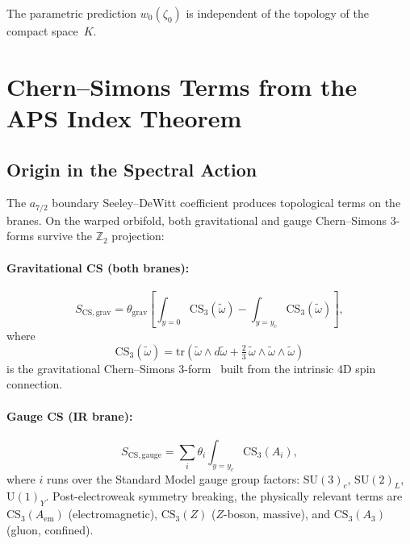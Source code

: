 \begin{corollary}\label{cor:4-topology}
The parametric prediction $w_0(\zeta_0)$ is independent of the topology of the compact space~$K$.
\end{corollary}


\section{Chern--Simons Terms from the APS Index Theorem}
\label{sec:4-chern-simons}

\subsection{Origin in the Spectral Action}
\label{sec:4-cs-origin}

The $a_{7/2}$ boundary Seeley--DeWitt coefficient produces topological terms on the branes. On the warped orbifold, both gravitational and gauge Chern--Simons 3-forms survive the $\mathbb{Z}_2$ projection:

\paragraph{Gravitational CS (both branes):}
\begin{equation}
  S_{\mathrm{CS,grav}} = \theta_{\mathrm{grav}} \left[
    \int_{y=0} \mathrm{CS}_3(\tilde{\omega})
  - \int_{y=y_c} \mathrm{CS}_3(\tilde{\omega})
  \right],
  \label{eq:4-39}
\end{equation}
where
\begin{equation}
  \mathrm{CS}_3(\tilde{\omega})
  = \mathrm{tr}\!\left(\tilde{\omega} \wedge d\tilde{\omega}
    + \tfrac{2}{3}\, \tilde{\omega} \wedge \tilde{\omega} \wedge \tilde{\omega}\right)
  \label{eq:4-40}
\end{equation}
is the gravitational Chern--Simons 3-form~\cite{ch4:ChernSimons1974} built from the intrinsic 4D spin connection.

\paragraph{Gauge CS (IR brane):}
\begin{equation}
  S_{\mathrm{CS,gauge}} = \sum_i \theta_i \int_{y=y_c} \mathrm{CS}_3(A_i),
  \label{eq:4-41}
\end{equation}
where $i$ runs over the Standard Model gauge group factors: $\mathrm{SU}(3)_c$, $\mathrm{SU}(2)_L$, $\mathrm{U}(1)_Y$. Post-electroweak symmetry breaking, the physically relevant terms are $\mathrm{CS}_3(A_{\mathrm{em}})$ (electromagnetic), $\mathrm{CS}_3(Z)$ ($Z$-boson, massive), and $\mathrm{CS}_3(A_3)$ (gluon, confined).

